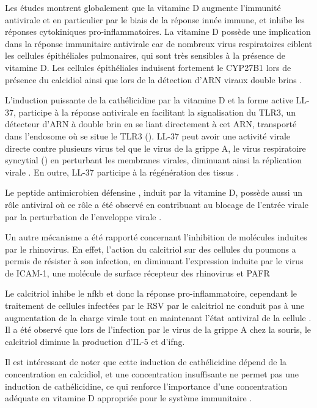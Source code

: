 \documentclass[
  a4paper,
  DIV=11,
  numbers=noendperiod,
  listof=totoc]{scrreprt}
\begin{document}
Les études montrent globalement que la vitamine D augmente l'immunité
antivirale et en particulier par le biais de la réponse innée immune, et
inhibe les réponses cytokiniques pro-inflammatoires. La vitamine D
possède une implication dans la réponse immunitaire antivirale car de
nombreux virus respiratoires ciblent les cellules épithéliales
pulmonaires, qui sont très sensibles à la présence de vitamine D. Les
cellules épithéliales induisent fortement le \ac{CYP27B1} lors de
présence du calcidiol ainsi que lors de la détection d'ARN viraux double
brins \autocite{Bishop.2021}.

L'induction puissante de la cathélicidine par la vitamine D et la forme
active LL-37, participe à la réponse antivirale en facilitant la
signalisation du TLR3, un détecteur d'ARN à double brin en se liant
directement à cet ARN, transporté dans l'endosome où se situe le TLR3
(). LL-37 peut avoir une activité virale directe
contre plusieurs virus tel que le virus de la grippe A, le virus
respiratoire syncytial () en perturbant les membranes virales,
diminuant ainsi la réplication virale
\autocite{Bishop.2021,Ismailova.2022}. En outre, LL-37 participe à la
régénération des tissus \autocite{Ismailova.2022}.

Le peptide antimicrobien défensine , induit par la vitamine D,
possède aussi un rôle antiviral où ce rôle a été observé en contribuant
au blocage de l'entrée virale par la perturbation de l'enveloppe virale
\autocite{Bishop.2021}.

Un autre mécanisme a été rapporté concernant l'inhibition de molécules
induites par le rhinovirus. En effet, l'action du calcitriol sur des
cellules du poumons a permis de résister à son infection, en diminuant
l'expression induite par le virus de \ac{ICAM-1}, une molécule de
surface récepteur des rhinovirus et \ac{PAFR} \autocite{Ismailova.2022}

Le calcitriol inhibe le \ac{nfkb} et donc la réponse pro-inflammatoire,
cependant le traitement de cellules infectées par le \ac{RSV} par le
calcitriol ne conduit pas à une augmentation de la charge virale tout en
maintenant l'état antiviral de la cellule
\autocite{Bishop.2021,Zdrenghea.2017}. Il a été observé que lors de
l'infection par le virus de la grippe A chez la souris, le calcitriol
diminue la production d'IL-5 et d'\ac{ifng}.

Il est intéressant de noter que cette induction de cathélicidine dépend
de la concentration en calcidiol, et une concentration insuffisante ne
permet pas une induction de cathélicidine, ce qui renforce l'importance
d'une concentration adéquate en vitamine D appropriée pour le système
immunitaire \autocite{White.2022}.
\end{document}
